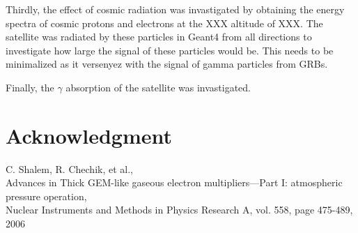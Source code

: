 \documentclass[12pt, a4paper,titlepage]{article}
\numberwithin{equation}{section}
\numberwithin{figure}{section}
\begin{document}
Thirdly, the effect of cosmic radiation was invastigated by obtaining the energy spectra of cosmic protons and electrons at the XXX altitude of XXX. The satellite was radiated by these particles in Geant4 from all directions to investigate how large the signal of these particles would be. This needs to be minimalized as it versenyez with the signal of gamma particles from GRBs.

Finally, the $\gamma$ absorption of the satellite was invastigated.

\pagebreak

\section{Acknowledgment}

 
\pagebreak

\begin{thebibliography}{99}

 C. Shalem, R. Chechik, et al.,\\
Advances in Thick GEM-like gaseous electron multipliers—Part I: atmospheric pressure operation,\\
Nuclear Instruments and Methods in Physics Research A, vol. 558, page 475-489, 2006

\end{thebibliography}

\pagebreak
\end{document}
